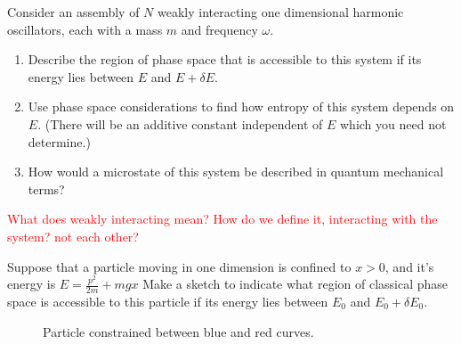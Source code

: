 \documentclass{article}
\begin{document}
    \begin{problem}
        Consider an assembly of $N$ weakly interacting one dimensional harmonic oscillators, each with a mass $m$ and frequency $\omega$.
        \begin{enumerate}[label=(\alph*)]
            \item Describe the region of phase space that is accessible to this system
            if its energy lies between $E$ and $E + \delta E$.
            \item Use phase space considerations to find how entropy of this system depends on $E$. (There will be an additive constant independent of $E$ which you need not determine.)
            \item How would a microstate of this system be described in quantum mechanical terms?
        \end{enumerate}
        \answerline
        \textcolor{red}{What does weakly interacting mean? How do we define it, interacting with the system? not each other?}
    \end{problem}\newpage
    \begin{problem}
        Suppose that a particle moving in one dimension is confined to $x>0$, and it's energy is $E=\frac{p^2}{2m}+mgx$ Make a sketch to indicate what
        region of classical phase space is accessible to this particle if its energy lies between $E_0$ and $E_0+\delta E_0$.
        \begin{figure}[H]
            \centering
            \caption{Particle constrained between blue and red curves.}
        \end{figure}
    \end{problem}\newpage
\end{document}
